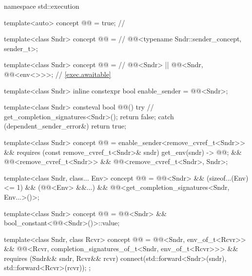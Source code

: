 %
\begin{codeblock}
namespace std::execution {
  template<auto>
    concept @@ = true;                                 // \expos

  template<class Sndr>
    concept @@ =                                         // \expos
      @@<typename Sndr::sender_concept, sender_t>;

  template<class Sndr>
    concept @@ =                                     // \expos
      @@<Sndr> ||
      @@<Sndr, @@<env<>>>;                 // \ref{exec.awaitable}

  template<class Sndr>
    inline constexpr bool enable_sender = @@<Sndr>;

  template<class Sndr>
    consteval bool @@() try {           // \expos
      get_completion_signatures<Sndr>();
      return false;
    } catch (dependent_sender_error&) {
      return true;
    }

  template<class Sndr>
    concept @@ =
      enable_sender<remove_cvref_t<Sndr>> &&
      requires (const remove_cvref_t<Sndr>& sndr) {
        { get_env(sndr) } -> @@;
      } &&
      @@<remove_cvref_t<Sndr>> &&
      @@<remove_cvref_t<Sndr>, Sndr>;

  template<class Sndr, class... Env>
    concept @@ =
      @@<Sndr> &&
      (sizeof...(Env) <= 1) &&
      (@@<Env> &&...) &&
      @@<get_completion_signatures<Sndr, Env...>()>;

  template<class Sndr>
    concept @@ =
      @@<Sndr> && bool_constant<@@<Sndr>()>::value;

  template<class Sndr, class Rcvr>
    concept @@ =
      @@<Sndr, env_of_t<Rcvr>> &&
      @@<Rcvr, completion_signatures_of_t<Sndr, env_of_t<Rcvr>>> &&
      requires (Sndr&& sndr, Rcvr&& rcvr) {
        connect(std::forward<Sndr>(sndr), std::forward<Rcvr>(rcvr));
      };
}
\end{codeblock}

